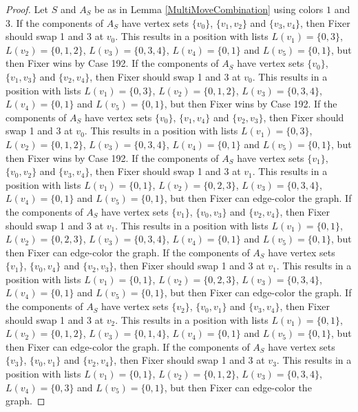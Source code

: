 \documentclass[12pt]{amsart}
\theoremstyle{plain}
\theoremstyle{definition}
\theoremstyle{remark}
\begin{document}
\begin{proof}
Let $S$ and $A_S$ be as in Lemma \ref{MultiMoveCombination} using colors $1$ and $3$. If the components of $A_S$ have vertex sets $\{v_0\}$, $\{v_1, v_2\}$ and $\{v_3, v_4\}$, then Fixer should swap 1 and 3 at $v_0$. This results in a position with lists $L(v_1) = \{0, 3\}$, $L(v_2) = \{0, 1, 2\}$, $L(v_3) = \{0, 3, 4\}$, $L(v_4) = \{0, 1\}$ and $L(v_5) = \{0, 1\}$, but then Fixer wins by Case 192.
If the components of $A_S$ have vertex sets $\{v_0\}$, $\{v_1, v_3\}$ and $\{v_2, v_4\}$, then Fixer should swap 1 and 3 at $v_0$. This results in a position with lists $L(v_1) = \{0, 3\}$, $L(v_2) = \{0, 1, 2\}$, $L(v_3) = \{0, 3, 4\}$, $L(v_4) = \{0, 1\}$ and $L(v_5) = \{0, 1\}$, but then Fixer wins by Case 192.
If the components of $A_S$ have vertex sets $\{v_0\}$, $\{v_1, v_4\}$ and $\{v_2, v_3\}$, then Fixer should swap 1 and 3 at $v_0$. This results in a position with lists $L(v_1) = \{0, 3\}$, $L(v_2) = \{0, 1, 2\}$, $L(v_3) = \{0, 3, 4\}$, $L(v_4) = \{0, 1\}$ and $L(v_5) = \{0, 1\}$, but then Fixer wins by Case 192.
If the components of $A_S$ have vertex sets $\{v_1\}$, $\{v_0, v_2\}$ and $\{v_3, v_4\}$, then Fixer should swap 1 and 3 at $v_1$. This results in a position with lists $L(v_1) = \{0, 1\}$, $L(v_2) = \{0, 2, 3\}$, $L(v_3) = \{0, 3, 4\}$, $L(v_4) = \{0, 1\}$ and $L(v_5) = \{0, 1\}$, but then Fixer can edge-color the graph.
If the components of $A_S$ have vertex sets $\{v_1\}$, $\{v_0, v_3\}$ and $\{v_2, v_4\}$, then Fixer should swap 1 and 3 at $v_1$. This results in a position with lists $L(v_1) = \{0, 1\}$, $L(v_2) = \{0, 2, 3\}$, $L(v_3) = \{0, 3, 4\}$, $L(v_4) = \{0, 1\}$ and $L(v_5) = \{0, 1\}$, but then Fixer can edge-color the graph.
If the components of $A_S$ have vertex sets $\{v_1\}$, $\{v_0, v_4\}$ and $\{v_2, v_3\}$, then Fixer should swap 1 and 3 at $v_1$. This results in a position with lists $L(v_1) = \{0, 1\}$, $L(v_2) = \{0, 2, 3\}$, $L(v_3) = \{0, 3, 4\}$, $L(v_4) = \{0, 1\}$ and $L(v_5) = \{0, 1\}$, but then Fixer can edge-color the graph.
If the components of $A_S$ have vertex sets $\{v_2\}$, $\{v_0, v_1\}$ and $\{v_3, v_4\}$, then Fixer should swap 1 and 3 at $v_2$. This results in a position with lists $L(v_1) = \{0, 1\}$, $L(v_2) = \{0, 1, 2\}$, $L(v_3) = \{0, 1, 4\}$, $L(v_4) = \{0, 1\}$ and $L(v_5) = \{0, 1\}$, but then Fixer can edge-color the graph.
If the components of $A_S$ have vertex sets $\{v_3\}$, $\{v_0, v_1\}$ and $\{v_2, v_4\}$, then Fixer should swap 1 and 3 at $v_3$. This results in a position with lists $L(v_1) = \{0, 1\}$, $L(v_2) = \{0, 1, 2\}$, $L(v_3) = \{0, 3, 4\}$, $L(v_4) = \{0, 3\}$ and $L(v_5) = \{0, 1\}$, but then Fixer can edge-color the graph.

\end{proof}
\end{document}
